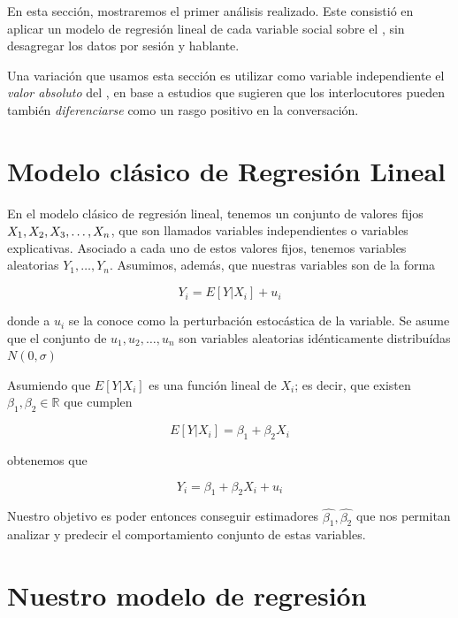 En esta sección, mostraremos el primer análisis realizado. Este consistió en aplicar un modelo de regresión lineal de cada variable social sobre el \entrainment, sin desagregar los datos por sesión y hablante.

Una variación que usamos esta sección es utilizar como variable independiente el \emph{valor absoluto} del \entrainment, en base a estudios que sugieren que los interlocutores pueden también \emph{diferenciarse} como un rasgo positivo en la conversación.

\section{Modelo clásico de Regresión Lineal}

En el modelo clásico de regresión lineal, tenemos un conjunto de valores fijos $X_1, X_2, \\ X_3, \ldots, X_n$, que son llamados variables independientes o variables explicativas. Asociado a cada uno de estos valores fijos, tenemos variables aleatorias $Y_1, \ldots, Y_n$. Asumimos, además, que nuestras variables son de la forma

\begin{equation}
  Y_i = E[Y|X_i] + u_i
\end{equation}

\noindent donde a $u_i$ se la conoce como la perturbación estocástica de la variable. Se asume que el conjunto de $u_1, u_2, \ldots, u_n$ son variables aleatorias idénticamente distribuídas $N(0, \sigma)$

Asumiendo que $E[Y|X_i]$ es una función lineal de $X_i$; es decir, que existen $\beta_1, \beta_2 \in \mathbb{R}$ que cumplen

\begin{equation}
  E[Y|X_i] = \beta_1 + \beta_2 X_i
\end{equation}

\noindent obtenemos que

\begin{equation}
  Y_i = \beta_1 + \beta_2 X_i + u_i
\end{equation}

Nuestro objetivo es poder entonces conseguir estimadores $\widehat{\beta_1}, \widehat{\beta_2}$ que nos permitan analizar y predecir el comportamiento conjunto de estas variables.


\section{Nuestro modelo de regresión}


